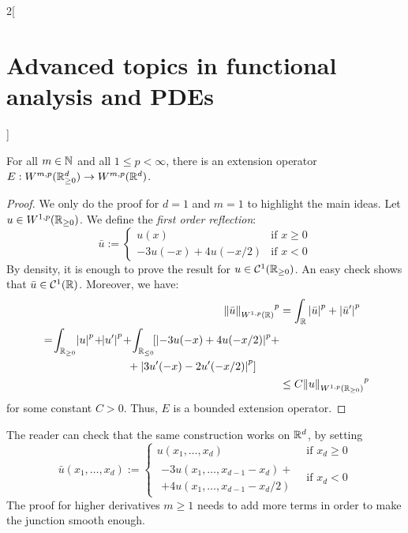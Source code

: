 \documentclass[../../../main_math.tex]{subfiles}
\begin{document}
\begin{multicols}{2}[\section{Advanced topics in functional analysis and PDEs}]
\begin{remark}
  \end{remark}
  \begin{theorem}
    For all $m\in\mathbb{N}$ and all $1\leq p<\infty$, there is an extension operator $E:W^{m,p}(\mathbb{R}_{\geq 0}^d)\to W^{m,p}(\mathbb{R}^d)$.
  \end{theorem}
  \begin{proof}
    We only do the proof for $d=1$ and $m=1$ to highlight the main ideas. Let $u\in W^{1,p}(\mathbb{R}_{\geq 0})$. We define the \emph{first order reflection}:
    $$
      \bar{u}:=\begin{cases}
        u(x)             & \text{if }x\geq 0 \\
        -3u(-x)+4u(-x/2) & \text{if }x<0
      \end{cases}
    $$
    By density, it is enough to prove the result for $u\in \mathcal{C}^1(\mathbb{R}_{\geq 0})$. An easy check shows that $\bar{u}\in \mathcal{C}^1(\mathbb{R})$. Moreover, we have:
    \begin{align*}
      {\norm{\bar{u}}_{W^{1,p}(\RR)}}^p & =\int_{\RR}{\abs{\bar{u}}^p}+{\abs{\bar{u}'}^p}                                                   \\
      \begin{split}
        & =\!\int_{\RR_{\geq 0}}\!{\abs{u}^p}\!+\!\!{\abs{u'}^p}\!+\!\int_{\RR_{\leq 0}}\![{\abs{-3u(-x)+4u(-x/2)}^p}+ \\
        & \hspace{2.75cm}+{\abs{3u'(-x)-2u'(-x/2)}^p}]
      \end{split} \\
                                        & \leq C{\norm{u}_{W^{1,p}(\RR_{\geq 0})}}^p
    \end{align*}
    for some constant $C>0$. Thus, $E$ is a bounded extension operator.
  \end{proof}
  \begin{remark}
    The reader can check that the same construction works on $\mathbb{R}^d$, by setting
    $$
      \bar{u}(x_1,\ldots,x_d):=
      \begin{cases}
        u(x_1,\ldots,x_d)               & \text{if }x_d\geq 0 \\
        \begin{split}
          -3u(x_1,\ldots,x_{d-1}-x_d)+ \\
          +4u(x_1,\ldots,x_{d-1}-x_d/2)
        \end{split} & \text{if }x_d<0
      \end{cases}
    $$
    The proof for higher derivatives $m \geq 1$ needs to add more terms in order to make the junction smooth enough.

\end{remark}
\end{multicols}
\end{document}
